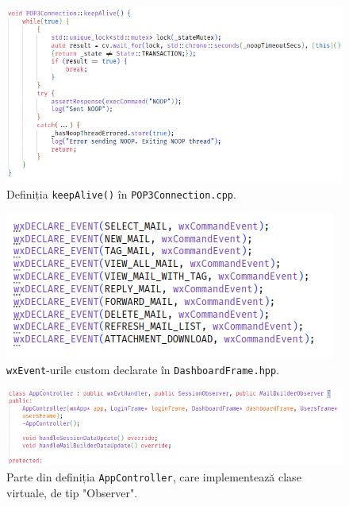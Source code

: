 \documentclass[runningheads]{llncs}
\begin{document}
\begin{figure}
    \centering
    \includegraphics[width=\textwidth]{keepAlive.png}
    \caption{Definiția \texttt{keepAlive()} în \texttt{POP3Connection.cpp}.}
    \label{fig:keepalive}
\end{figure}

\begin{figure}
    \centering
    \includegraphics[width=\textwidth]{wxEvents.png}
    \caption{\texttt{wxEvent}-urile custom declarate în \texttt{DashboardFrame.hpp}.}
    \label{fig:wxEvents}
\end{figure}

\begin{figure}
    \centering
    \includegraphics[width=\textwidth]{appControllerSubscribe.png}
    \caption{Parte din definiția \texttt{AppController}, care implementează clase virtuale, de tip "Observer".}
    \label{fig:subscribers}
\end{figure}
\end{document}
